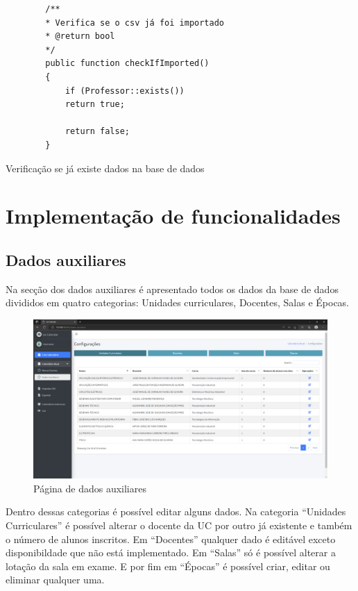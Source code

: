 \documentclass[12pt, twoside]{report}
\begin{document}
	\begin{listing}[H]
		\begin{verbatim}
		/**
		* Verifica se o csv já foi importado
		* @return bool
		*/
		public function checkIfImported()
		{
			if (Professor::exists())
			return true;
			
			return false;
		}
		\end{verbatim}
		\caption{Verificação se já existe dados na base de dados}
		\label{checkIfImported}
	\end{listing}
	
		
	\section{Implementação de funcionalidades}
	\subsection{Dados auxiliares}
	
	Na secção dos dados auxiliares é apresentado todos os dados da base de dados divididos em quatro categorias: Unidades curriculares, Docentes, Salas e Épocas. 
	
	\begin{figure}[H] 
		
	\centering 			\includegraphics[width=1\textwidth,height=1\textheight,keepaspectratio]{image/dadosAuxiliares}
	\caption{Página de dados auxiliares}
	\label{dadosAuxiliares}
		
	\end{figure}
	
	Dentro dessas categorias é possível editar alguns dados. Na categoria ``Unidades Curriculares'' é possível alterar o docente da UC por outro já existente e também o número de alunos inscritos. Em ``Docentes'' qualquer dado é editável exceto disponibildade que não está implementado. Em ``Salas'' só é possível alterar a lotação da sala em exame. E por fim em ``Épocas'' é possível criar, editar ou eliminar qualquer uma.
	
\end{document}

